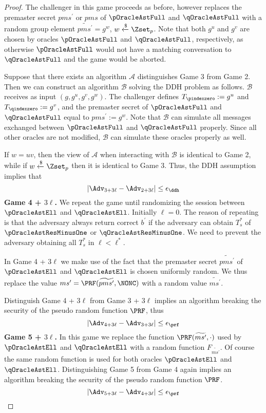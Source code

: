 \begin{proof}
 The challenger in this game proceeds as before, however replaces the premaster secret $pms^{\prime}$ or $pms$ of $\pOracleAstFull$ and $\qOracleAstFull$ with a random group element $\widetilde{pms^{\prime}} = g^w$, $w \xleftarrow{\$} \Zset_p$. Note that both $g^u$ and $g^v$ are chosen by oracles $\pOracleAstFull$ and $\qOracleAstFull$, respectively, as otherwise $\pOracleAstFull$ would not have a matching conversation to $\qOracleAstFull$ and the game would be aborted.

 Suppose that there exists an algorithm $\mathcal{A}$ distinguishes Game 3 from Game 2. Then we can construct an algorithm $\mathcal{B}$ solving the DDH problem as follows. $\mathcal{B}$ receives as input $(g,g^u,g^v,g^w)$. The challenger defines $T_{\pindexzero} := g^u$ and $T_{\qindexzero} := g^v$, and the premaster secret of $\pOracleAstFull$ and $\qOracleAstFull$ equal to $pms^{\prime} := g^w$. Note that $\mathcal{B}$ can simulate all messages exchanged between $\pOracleAstFull$ and $\qOracleAstFull$ properly. Since all other oracles are not modified, $\mathcal{B}$ can simulate these oracles properly as well.

 If $w=uv$, then the view of $\mathcal{A}$ when interacting with $\mathcal{B}$ is identical to Game 2, while if $w \xleftarrow{\$}\Zset_p$ then it is identical to Game 3. Thus, the DDH assumption implies that
 \begin{equation}
  |\Adv_{3 + 3\ell} - \Adv_{2 + 3\ell}| \leq \epsilon_{\ddh}
 \end{equation}%
%
%
 \textbf{Game 4 + $3\ell$.} We repeat the game until randomizing the session between $\pOracleAstEll$ and $\qOracleAstEll$. Initially $\ell = 0$. The reason of repeating is that the adversary always return correct $b^{\prime}$ if the adversary can obtain $T_s^{\ast}$ of $\pOracleAstResMinusOne$ or $\qOracleAstResMinusOne$. We need to prevent the adversary obtaining all $T_s^{\ast}$ in $\ell < \ell^{\ast}$.

 In Game 4 + 3$\ell$ we make use of the fact that the premaster secret $\widetilde{pms^{\prime}}$ of $\pOracleAstEll$ and $\qOracleAstEll$ is chosen uniformly random. We thus replace the value $ms^{\prime} = \PRF(\widetilde{pms^{\prime}}, \NONC)$ with a random value $\widetilde{ms^{\prime}}$.

 Distinguish Game 4 + 3$\ell$ from Game 3 + 3$\ell$ implies an algorithm breaking the security of the pseudo random function $\PRF$, thus
 \begin{equation}
  |\Adv_{4 + 3\ell} - \Adv_{3 + 3\ell}| \leq \epsilon_{\prf}
 \end{equation}%
%
%
 \textbf{Game 5 + $3\ell$.} In this game we replace the function $\PRF(\widetilde{ms^{\prime}}, \cdot)$ used by $\pOracleAstEll$ and $\qOracleAstEll$ with a random function $F_{\widetilde{ms^{\prime}}}$. Of course the same random function is used for both oracles $\pOracleAstEll$ and $\qOracleAstEll$. Distinguishing Game 5 from Game 4 again implies an algorithm breaking the security of the pseudo random function $\PRF$.
 \begin{equation}
  |\Adv_{5 + 3\ell} - \Adv_{4 + 3\ell}| \leq \epsilon_{\prf}
 \end{equation}%


\end{proof}
